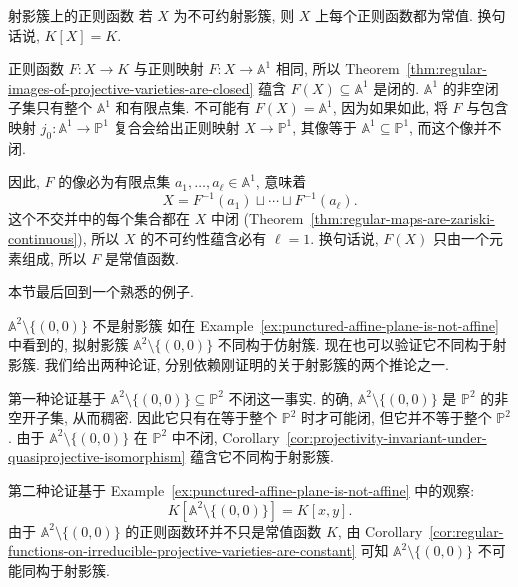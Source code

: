 \begin{Corollary}{射影簇上的正则函数}\leavevmode\label{cor:regular-functions-on-irreducible-projective-varieties-are-constant}
若 $X$ 为不可约射影簇, 则 $X$ 上每个正则函数都为常值. 换句话说, $K[X]=K$.
\end{Corollary}
\begin{Proof}
正则函数 $F:X\to K$ 与正则映射 $F:X\to\mathbb{A}^{1}$ 相同, 所以 Theorem~\ref{thm:regular-images-of-projective-varieties-are-closed} 蕴含 $F(X)\subseteq\mathbb{A}^{1}$ 是闭的. $\mathbb{A}^{1}$ 的非空闭子集只有整个 $\mathbb{A}^{1}$ 和有限点集. 不可能有 $F(X)=\mathbb{A}^{1}$, 因为如果如此, 将 $F$ 与包含映射 $j_{0}:\mathbb{A}^{1}\to\mathbb{P}^{1}$ 复合会给出正则映射 $X\to\mathbb{P}^{1}$, 其像等于 $\mathbb{A}^{1}\subseteq\mathbb{P}^{1}$, 而这个像并不闭.

因此, $F$ 的像必为有限点集 $a_{1},\ldots,a_{\ell}\in\mathbb{A}^{1}$, 意味着
\[
  X=F^{-1}(a_{1})\sqcup\cdots\sqcup F^{-1}(a_{\ell}).
\]
这个不交并中的每个集合都在 $X$ 中闭 (Theorem~\ref{thm:regular-maps-are-zariski-continuous}), 所以 $X$ 的不可约性蕴含必有 $\ell=1$. 换句话说, $F(X)$ 只由一个元素组成, 所以 $F$ 是常值函数.
\end{Proof}

本节最后回到一个熟悉的例子.

\begin{Example}{$\mathbb{A}^{2}\setminus\{(0,0)\}$ 不是射影簇}\leavevmode\label{ex:punctured-affine-plane-is-not-projective}
如在 Example~\ref{ex:punctured-affine-plane-is-not-affine} 中看到的, 拟射影簇 $\mathbb{A}^{2}\setminus\{(0,0)\}$ 不同构于仿射簇. 现在也可以验证它不同构于射影簇. 我们给出两种论证, 分别依赖刚证明的关于射影簇的两个推论之一.

第一种论证基于 $\mathbb{A}^{2}\setminus\{(0,0)\}\subseteq\mathbb{P}^{2}$ 不闭这一事实. 的确, $\mathbb{A}^{2}\setminus\{(0,0)\}$ 是 $\mathbb{P}^{2}$ 的非空开子集, 从而稠密. 因此它只有在等于整个 $\mathbb{P}^{2}$ 时才可能闭, 但它并不等于整个 $\mathbb{P}^{2}$. 由于 $\mathbb{A}^{2}\setminus\{(0,0)\}$ 在 $\mathbb{P}^{2}$ 中不闭, Corollary~\ref{cor:projectivity-invariant-under-quasiprojective-isomorphism} 蕴含它不同构于射影簇.

第二种论证基于 Example~\ref{ex:punctured-affine-plane-is-not-affine} 中的观察:
\[
  K[\mathbb{A}^{2}\setminus\{(0,0)\}]=K[x,y].
\]
由于 $\mathbb{A}^{2}\setminus\{(0,0)\}$ 的正则函数环并不只是常值函数 $K$, 由 Corollary~\ref{cor:regular-functions-on-irreducible-projective-varieties-are-constant} 可知 $\mathbb{A}^{2}\setminus\{(0,0)\}$ 不可能同构于射影簇.
\end{Example}

